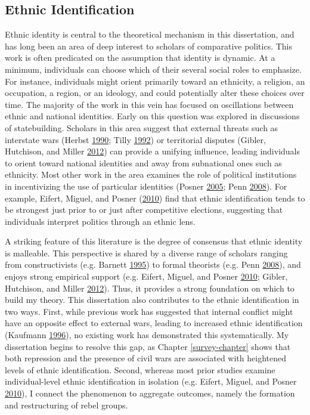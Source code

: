 \documentclass[12pt,]{book}
\theoremstyle{definition}
\theoremstyle{definition}
\theoremstyle{remark}
\begin{document}
\subsection{Ethnic Identification}\label{ethnic-identification}

Ethnic identity is central to the theoretical mechanism in this
dissertation, and has long been an area of deep interest to scholars of
comparative politics. This work is often predicated on the assumption
that identity is dynamic. At a minimum, individuals can choose which of
their several social roles to emphasize. For instance, individuals might
orient primarily toward an ethnicity, a religion, an occupation, a
region, or an ideology, and could potentially alter these choices over
time. The majority of the work in this vein has focused on oscillations
between ethnic and national identities. Early on this question was
explored in discussions of statebuilding. Scholars in this area suggest
that external threats such as interstate wars (Herbst
\protect\hyperlink{ref-Herbst1990}{1990}; Tilly
\protect\hyperlink{ref-Tilly1992}{1992}) or territorial disputes
(Gibler, Hutchison, and Miller \protect\hyperlink{ref-Gibler2012}{2012})
can provide a unifying influence, leading individuals to orient toward
national identities and away from subnational ones such as ethnicity.
Most other work in the area examines the role of political institutions
in incentivizing the use of particular identities (Posner
\protect\hyperlink{ref-Posner2005}{2005}; Penn
\protect\hyperlink{ref-Penn2008}{2008}). For example, Eifert, Miguel,
and Posner (\protect\hyperlink{ref-Eifert2010}{2010}) find that ethnic
identification tends to be strongest just prior to or just after
competitive elections, suggesting that individuals interpret politics
through an ethnic lens.

A striking feature of this literature is the degree of consensus that
ethnic identity is malleable. This perspective is shared by a diverse
range of scholars ranging from constructivists (e.g. Barnett
\protect\hyperlink{ref-Barnett1995}{1995}) to formal theorists (e.g.
Penn \protect\hyperlink{ref-Penn2008}{2008}), and enjoys strong
empirical support (e.g. Eifert, Miguel, and Posner
\protect\hyperlink{ref-Eifert2010}{2010}; Gibler, Hutchison, and Miller
\protect\hyperlink{ref-Gibler2012}{2012}). Thus, it provides a strong
foundation on which to build my theory. This dissertation also
contributes to the ethnic identification in two ways. First, while
previous work has suggested that internal conflict might have an
opposite effect to external wars, leading to increased ethnic
identification (Kaufmann \protect\hyperlink{ref-Kaufmann1996b}{1996}),
no existing work has demonstrated this systematically. My dissertation
begins to resolve this gap, as Chapter \ref{survey-chapter} shows that
both repression and the presence of civil wars are associated with
heightened levels of ethnic identification. Second, whereas most prior
studies examine individual-level ethnic identification in isolation
(e.g. Eifert, Miguel, and Posner
\protect\hyperlink{ref-Eifert2010}{2010}), I connect the phenomenon to
aggregate outcomes, namely the formation and restructuring of rebel
groups.
\end{document}
